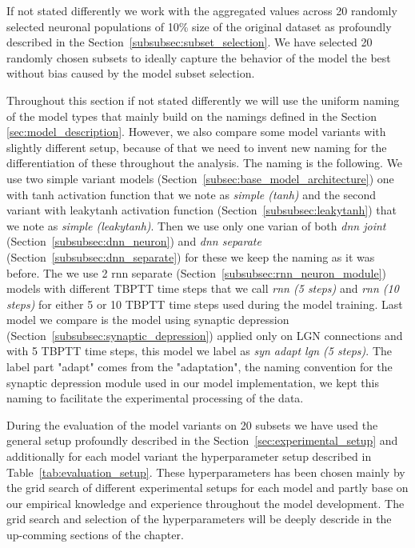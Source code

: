 If not stated differently we work with the aggregated values across 20 randomly selected neuronal populations of 10\% size of the original dataset as profoundly described in the Section~\ref{subsubsec:subset_selection}. We have selected 20 randomly chosen subsets to ideally capture the behavior of the model the best without bias caused by the model subset selection.

Throughout this section if not stated differently we will use the uniform naming of the model types that mainly build on the namings defined in the Section~
\ref{sec:model_description}. However, we also compare some model variants with slightly different setup, because of that we need to invent new naming for the differentiation of these throughout the analysis. The naming is the following. We use two simple variant models (Section~\ref{subsec:base_model_architecture}) one with tanh activation function that we note as \emph{simple (tanh)} and the second variant with leakytanh activation function (Section~\ref{subsubsec:leakytanh}) that we note as \emph{simple (leakytanh)}. Then we use only one varian of both \emph{dnn joint} (Section~\ref{subsubsec:dnn_neuron}) and \emph{dnn separate} (Section~\ref{subsubsec:dnn_separate}) for these we keep the naming as it was before. The we use 2 rnn separate (Section~\ref{subsubsec:rnn_neuron_module}) models with different TBPTT time steps that we call \emph{rnn (5 steps)} and \emph{rnn (10 steps)} for either 5 or 10 TBPTT time steps used during the model training. Last model we compare is the model using synaptic depression (Section~\ref{subsubsec:synaptic_depression}) applied only on LGN connections and with 5 TBPTT time steps, this model we label as \emph{syn adapt lgn (5 steps)}. The label part "adapt" comes from the "adaptation", the naming convention for the synaptic depression module used in our model implementation, we kept this naming to facilitate the experimental processing of the data. 

During the evaluation of the model variants on 20 subsets we have used the general setup profoundly described in the Section~\ref{sec:experimental_setup} and additionally for each model variant the hyperparameter setup described in Table~\ref{tab:evaluation_setup}. These hyperparameters has been chosen mainly by the grid search of different experimental setups for each model and partly base on our empirical knowledge and experience throughout the model development. The grid search and selection of the hyperparameters will be deeply descride in the up-comming sections of the chapter.

